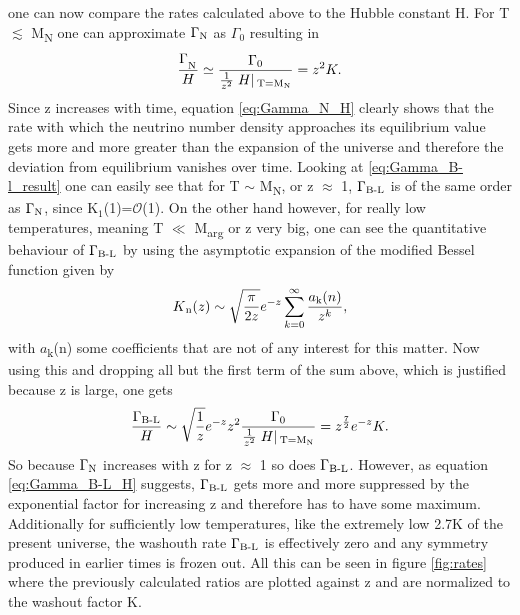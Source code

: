 one can now compare the rates calculated above to the Hubble constant H.\newline
For T $\lesssim$ M\textsubscript{N} one can approximate $\Gamma\textsubscript{N}$ as $\Gamma_0$ resulting in 
\begin{equation}
	\frac{\Gamma_\textsubscript{N}}{H}\simeq\frac{\Gamma_0}{\frac{1}{z^2}\left.H\right|\textsubscript{T=M\textsubscript{N}}}=z^2K.
	\label{eq:Gamma_N_H}
\end{equation}
Since z increases with time, equation \eqref{eq:Gamma_N_H} clearly shows that the rate with which the neutrino number density approaches its equilibrium value gets more and more greater than the expansion of the universe and therefore the deviation from equilibrium vanishes over time. \newline
Looking at \eqref{eq:Gamma_B-l_result} one can easily see that for T $\sim$ M\textsubscript{N}, or z $\approx$ 1, $\Gamma\textsubscript{B-L}$ is of the same order as $\Gamma\textsubscript{N}$, since K$_1$(1)=$\mathcal{O}$(1). On the other hand however, for really low temperatures, meaning T $\ll$ M\textsubscript{arg} or z very big, one can see the quantitative behaviour of $\Gamma\textsubscript{B-L}$ by using the asymptotic expansion of the modified Bessel function given by
\begin{equation*}
	K\textsubscript{n}(z)\sim\sqrt{\frac{\pi}{2z}}e^{-z}\sum_{k=0}^{\infty}\frac{a\textsubscript{k}(n)}{z^k},
\end{equation*}
with $a$\textsubscript{k}(n) some coefficients that are not of any interest for this matter. Now using this and dropping all but the first term of the sum above, which is justified because z is large, one gets
\begin{equation}
	\frac{\Gamma\textsubscript{B-L}}{H}\sim\sqrt{\frac{1}{z}}e^{-z}z^2\frac{\Gamma_0}{\frac{1}{z^2}\left.H\right|\textsubscript{T=M\textsubscript{N}}}=z^\frac{7}{2}e^{-z}K.
	\label{eq:Gamma_B-L_H}
\end{equation}
So because $\Gamma\textsubscript{N}$ increases with z for z $\approx$ 1 so does $\Gamma\textsubscript{B-L}$. However, as equation \eqref{eq:Gamma_B-L_H} suggests, $\Gamma\textsubscript{B-L}$ gets more and more suppressed by the exponential factor for increasing z and therefore has to have some maximum. Additionally for sufficiently low temperatures, like the extremely low 2.7K of the present universe, the washouth rate $\Gamma\textsubscript{B-L}$ is effectively zero and any symmetry produced in earlier times is frozen out. 
All this can be seen in figure \ref{fig:rates} where the previously calculated ratios are plotted against z and are normalized to the washout factor K.
